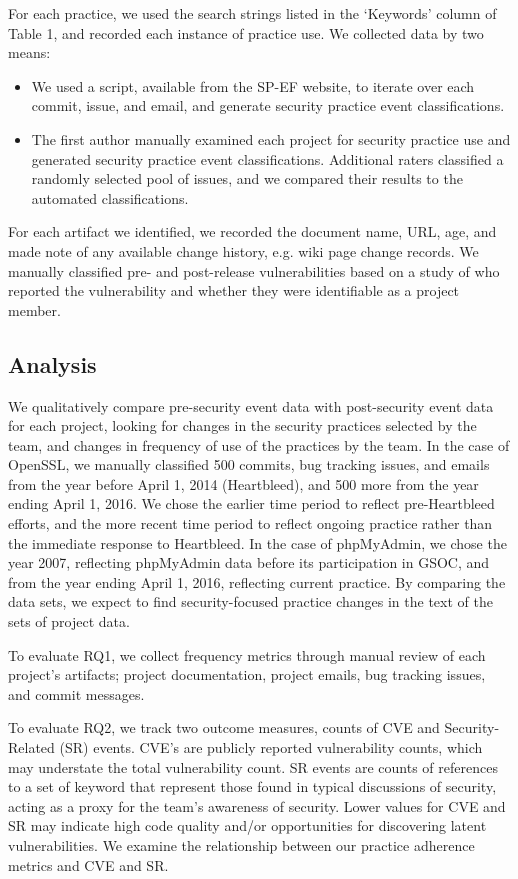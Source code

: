 For each practice, we used the search strings listed in the ‘Keywords’ column of Table 1, and recorded each instance of practice use.  We collected data by two means:
\begin{itemize}
\item We used a script, available from the SP-EF website, to iterate over each commit, issue, and email, and generate security practice event classifications.
\item The first author manually examined each project for security practice use and generated security practice event classifications. Additional raters classified a randomly selected pool of issues, and we compared their results to the automated classifications.
\end{itemize}

For each artifact we identified, we recorded the document name, URL, age, and made note of any available change history, e.g. wiki page change records. We manually classified pre- and post-release vulnerabilities based on a study of who reported the vulnerability and whether they were identifiable as a project member.

\subsection{Analysis}

We qualitatively compare pre-security event data with post-security event data for each project, looking for changes in the security practices selected by the team, and changes in frequency of use of the practices by the team. In the case of OpenSSL, we manually classified 500 commits, bug tracking issues, and emails from the year before April 1, 2014 (Heartbleed), and 500 more from the year ending April 1, 2016.  We chose the earlier time period to reflect pre-Heartbleed efforts, and the more recent time period to reflect ongoing practice rather than the immediate response to Heartbleed. In the case of phpMyAdmin, we chose the year 2007, reflecting phpMyAdmin data before its participation in GSOC, and from the year ending April 1, 2016, reflecting current practice. By comparing the data sets, we expect to find security-focused practice changes in the text of the sets of project data.

To evaluate RQ1, we collect frequency metrics through manual review of each project’s artifacts; project documentation, project emails, bug tracking issues, and commit messages.  

To evaluate RQ2, we track two outcome measures, counts of CVE and Security-Related (SR) events. CVE's are publicly reported vulnerability counts, which may understate the total vulnerability count.  SR events are counts of references to a set of keyword that represent those found in typical discussions of security, acting as a proxy for the team's awareness of security. Lower values for CVE and SR may indicate high code quality and/or opportunities for discovering latent vulnerabilities. We examine the relationship between our practice adherence metrics and CVE and SR.
